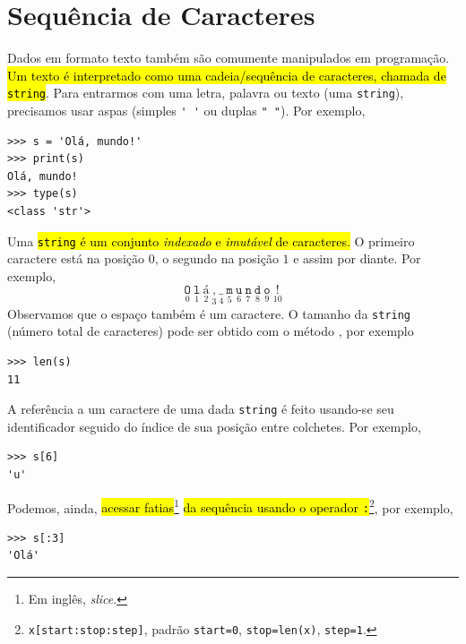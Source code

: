 \section{Sequência de Caracteres}\label{cap_lingua_sec_string}

Dados em formato texto também são comumente manipulados em programação. \hl{Um texto é interpretado como uma cadeia/sequência de caracteres, chamada de \texttt{string}}. Para entrarmos com uma letra, palavra ou texto (uma \texttt{string}), precisamos usar aspas (simples \lstinline+' '+ ou duplas \lstinline+" "+). Por exemplo,

\begin{lstlisting}
>>> s = 'Olá, mundo!'
>>> print(s)
Olá, mundo!
>>> type(s)
<class 'str'>
\end{lstlisting}

Uma \hl{\texttt{string} é um conjunto \emph{indexado} e \emph{imutável} de caracteres.} O primeiro caractere está na posição $0$, o segundo na posição $1$ e assim por diante. Por exemplo,
\begin{equation}
  \underset{0}{\texttt{O}}~\underset{1}{\texttt{l}}~\underset{2}{\texttt{á}}~\underset{3}{\texttt{,}}~\underset{4}{\texttt{\_}}~\underset{5}{\texttt{m}}~\underset{6}{\texttt{u}}~\underset{7}{\texttt{n}}~\underset{8}{\texttt{d}}~\underset{9}{\texttt{o}}~\underset{10}{\texttt{!}}
\end{equation}
Observamos que o espaço também é um caractere. O tamanho da \texttt{string} (número total de caracteres) pode ser obtido com o método {\PYTHONlen}, por exemplo

\begin{lstlisting}
>>> len(s)
11
\end{lstlisting}

A referência a um caractere de uma dada \texttt{string} é feito usando-se seu identificador seguido do índice de sua posição entre colchetes. Por exemplo,

\begin{lstlisting}
>>> s[6]
'u'
\end{lstlisting}

Podemos, ainda, \hl{acessar fatias}\footnote{Em inglês, \textit{slice}.}\hl{ da sequência usando o operador \texttt{:}}\footnote{{\lstinline+x[start:stop:step]+}, padrão {\lstinline+start=0+}, {\lstinline+stop=len(x)+}, {\lstinline+step=1+.}}, por exemplo,

\begin{lstlisting}
>>> s[:3]
'Olá'
\end{lstlisting}

